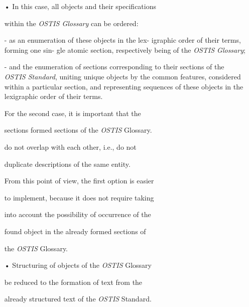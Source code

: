 \documentclass{article}
\begin{document}
\begin{multicols}{2}
\begin{itemize}
\hspace{-6mm}• In this case, all objects and their specifications

\hspace{-3mm}within the \textit{OSTIS Glossary} can be ordered:

\item[-] as an enumeration of these objects in the lex-
igraphic order of their terms, forming one sin-
gle atomic section, respectively being of the \textit{OSTIS
Glossary}; 
\item[-] and the enumeration of sections corresponding
to their sections of the \textit{OSTIS Standard}, uniting unique
objects by the common features, considered within
a particular section, and representing sequences
of these objects in the lexigraphic order of their
terms. 

\hspace{-5mm} For the second case, it is important that the 

\hspace{-5mm} sections formed sections of the \textit{OSTIS} Glossary.

\hspace{-5mm} do not overlap with each other, i.e., do not 

\hspace{-5mm} duplicate descriptions of the same entity. 

\hspace{-5mm} From this point of view, the first option is easier 

\hspace{-5mm} to implement, because it does not require taking 

\hspace{-5mm} into account the possibility of occurrence of the 

\hspace{-5mm} found object in the already formed sections of 

\hspace{-5mm} the \textit{OSTIS} Glossary.

\hspace{-8mm} • Structuring of objects of the \textit{OSTIS} Glossary 

\hspace{-4mm}be reduced to the formation of text from the

\hspace{-4mm}already structured text of the \textit{OSTIS} Standard.
\end{itemize}


\end{multicols}
\end{document}
